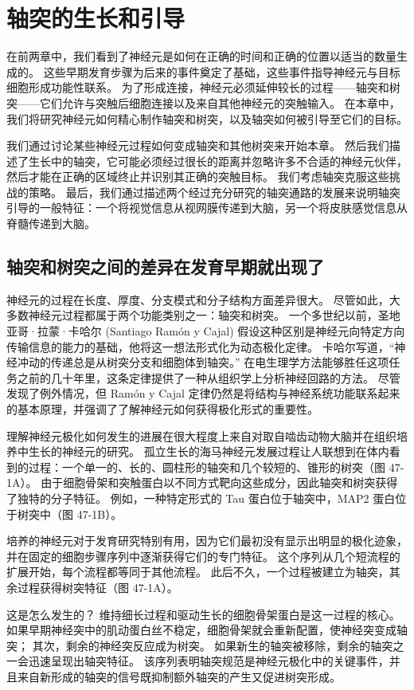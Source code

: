 \chapter{轴突的生长和引导} \label{chap:chap47}
在前两章中，我们看到了神经元是如何在正确的时间和正确的位置以适当的数量生成的。 这些早期发育步骤为后来的事件奠定了基础，这些事件指导神经元与目标细胞形成功能性联系。 为了形成连接，神经元必须延伸较长的过程——轴突和树突——它们允许与突触后细胞连接以及来自其他神经元的突触输入。 在本章中，我们将研究神经元如何精心制作轴突和树突，以及轴突如何被引导至它们的目标。

我们通过讨论某些神经元过程如何变成轴突和其他树突来开始本章。 然后我们描述了生长中的轴突，它可能必须经过很长的距离并忽略许多不合适的神经元伙伴，然后才能在正确的区域终止并识别其正确的突触目标。 我们考虑轴突克服这些挑战的策略。 最后，我们通过描述两个经过充分研究的轴突通路的发展来说明轴突引导的一般特征：一个将视觉信息从视网膜传递到大脑，另一个将皮肤感觉信息从脊髓传递到大脑。

\section{轴突和树突之间的差异在发育早期就出现了}

神经元的过程在长度、厚度、分支模式和分子结构方面差异很大。 尽管如此，大多数神经元过程都属于两个功能类别之一：轴突和树突。 一个多世纪以前，圣地亚哥·拉蒙·卡哈尔 (Santiago Ramón y Cajal) 假设这种区别是神经元向特定方向传输信息的能力的基础，他将这一想法形式化为动态极化定律。 卡哈尔写道，“神经冲动的传递总是从树突分支和细胞体到轴突。” 在电生理学方法能够胜任这项任务之前的几十年里，这条定律提供了一种从组织学上分析神经回路的方法。 尽管发现了例外情况，但 Ramón y Cajal 定律仍然是将结构与神经系统功能联系起来的基本原理，并强调了了解神经元如何获得极化形式的重要性。

理解神经元极化如何发生的进展在很大程度上来自对取自啮齿动物大脑并在组织培养中生长的神经元的研究。 孤立生长的海马神经元发展过程让人联想到在体内看到的过程：一个单一的、长的、圆柱形的轴突和几个较短的、锥形的树突（图 47-1A）。 由于细胞骨架和突触蛋白以不同方式靶向这些成分，因此轴突和树突获得了独特的分子特征。 例如，一种特定形式的 Tau 蛋白位于轴突中，MAP2 蛋白位于树突中（图 47-1B）。

培养的神经元对于发育研究特别有用，因为它们最初没有显示出明显的极化迹象，并在固定的细胞步骤序列中逐渐获得它们的专门特征。 这个序列从几个短流程的扩展开始，每个流程都等同于其他流程。 此后不久，一个过程被建立为轴突，其余过程获得树突特征（图 47-1A）。

这是怎么发生的？ 维持细长过程和驱动生长的细胞骨架蛋白是这一过程的核心。 如果早期神经突中的肌动蛋白丝不稳定，细胞骨架就会重新配置，使神经突变成轴突； 其次，剩余的神经突反应成为树突。 如果新生的轴突被移除，剩余的轴突之一会迅速呈现出轴突特征。 该序列表明轴突规范是神经元极化中的关键事件，并且来自新形成的轴突的信号既抑制额外轴突的产生又促进树突形成。

